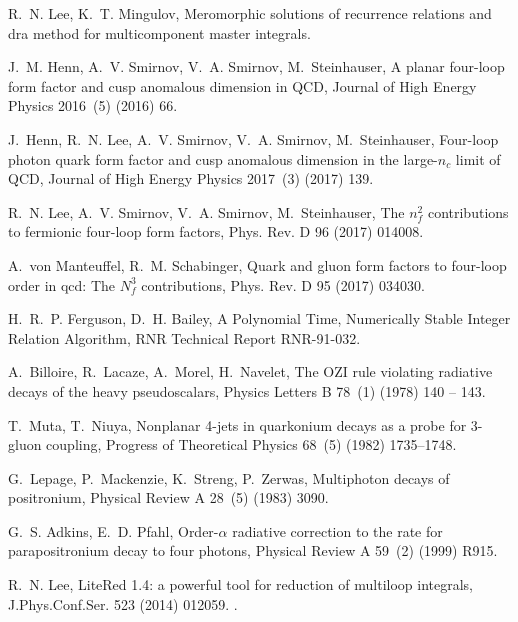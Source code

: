 \documentclass[sort&compress]{elsarticle}
\begin{document}
\begin{thebibliography}{10}
	R.~N. Lee, K.~T. Mingulov, Meromorphic solutions of recurrence relations and
	dra method for multicomponent master integrals.
	
	J.~M. Henn, A.~V. Smirnov, V.~A. Smirnov, M.~Steinhauser, {A planar four-loop
		form factor and cusp anomalous dimension in QCD}, Journal of High Energy
	Physics 2016~(5) (2016) 66.
	
	J.~Henn, R.~N. Lee, A.~V. Smirnov, V.~A. Smirnov, M.~Steinhauser, Four-loop
	photon quark form factor and cusp anomalous dimension in the large-$n_c$
	limit of {QCD}, Journal of High Energy Physics 2017~(3) (2017) 139.
	
	R.~N. Lee, A.~V. Smirnov, V.~A. Smirnov, M.~Steinhauser, The $n_f^2$
	contributions to fermionic four-loop form factors, Phys. Rev. D 96 (2017)
	014008.
	
	A.~von Manteuffel, R.~M. Schabinger, Quark and gluon form factors to four-loop
	order in qcd: The ${N}_{f}^{3}$ contributions, Phys. Rev. D 95 (2017) 034030.
	
	H.~R.~P. Ferguson, D.~H. Bailey, {A Polynomial Time, Numerically Stable Integer
		Relation Algorithm}, RNR Technical Report RNR-91-032.
	
	A.~Billoire, R.~Lacaze, A.~Morel, H.~Navelet, {The OZI rule violating radiative
		decays of the heavy pseudoscalars}, Physics Letters B 78~(1) (1978) 140 --
	143.
	
	T.~Muta, T.~Niuya, {Nonplanar 4-jets in quarkonium decays as a probe for
		3-gluon coupling}, Progress of Theoretical Physics 68~(5) (1982) 1735--1748.
	
	G.~Lepage, P.~Mackenzie, K.~Streng, P.~Zerwas, {Multiphoton decays of
		positronium}, Physical Review A 28~(5) (1983) 3090.
	
	G.~S. Adkins, E.~D. Pfahl, {Order-$\alpha$ radiative correction to the rate for
		parapositronium decay to four photons}, Physical Review A 59~(2) (1999) R915.
	
	R.~N. Lee, {LiteRed 1.4: a powerful tool for reduction of multiloop integrals},
	J.Phys.Conf.Ser. 523 (2014) 012059.
	\newblock \href {http://arxiv.org/abs/1310.1145} {}.
	

\end{thebibliography}
\end{document}
